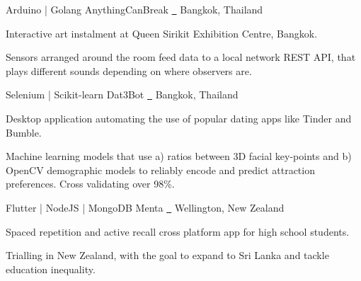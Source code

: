 
\begin{cventries}
 
  \cventry 
    { Arduino | Golang  } %
    { AnythingCanBreak\; \href{https://github.com/yohanderose/AnythingCanBreak}{\faGithub\ }	} %
	{Bangkok, Thailand} %
    {} %
    {
      \begin{cvitems} %
		  \item { Interactive art instalment at Queen Sirikit Exhibition Centre, Bangkok. }
		  \item { Sensors arranged around the room feed data to a local network REST API, that plays different sounds depending on where observers are. }
      \end{cvitems}
    }

  \cventry
    { Selenium | Scikit-learn } %
    {Dat3Bot\; \href{https://github.com/yohanderose/Dat3Bot}{\faGithub\ }	\href{https://yohanderose.dev/dating-with-python}\faBook} %
    {Bangkok, Thailand} %
    {} %
    {
      \begin{cvitems} %
      	\item { Desktop application automating the use of popular dating apps like Tinder and Bumble. }
      	\item { Machine learning models that use a) ratios between 3D facial key-points and b) OpenCV demographic models to reliably encode and predict attraction preferences. Cross validating over 98\%.}
      \end{cvitems}
    }


  \cventry 
    {  Flutter | NodeJS | MongoDB } %
    { Menta\; \href{https://github.com/mentanz/menta-app}{\faGithub\ }	} %
	{Wellington, New Zealand} %
    {} %
    {
      \begin{cvitems} %
      	\item { Spaced repetition and active recall cross platform app for high school students. }
		\item{ Trialling in New Zealand, with the goal to expand to Sri Lanka and tackle education inequality. }
      \end{cvitems}
    }


\end{cventries}

